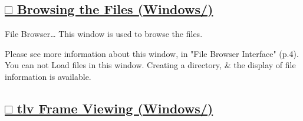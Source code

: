 \documentclass[a4paper,10pt]{article}
\begin{document}
\newpage

\subsection*{\uline{□ Browsing the Files (Windows/)}}

\normalsize
\noindent File Browser… This window is used to browse the files.\par
\footnotesize
\noindent Please see more information about this window, in "File Browser Interface" (p.4).\\
You can not Load files in this window. Creating a directory, \& the display of file information is available.\\

\subsection*{\uline{□ tlv Frame Viewing (Windows/)}}
\end{document}
